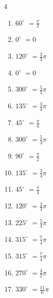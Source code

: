 \begin{multicols}{4}
\begin{enumerate}
  \item $\displaystyle 60^{\circ}$
        $\displaystyle =\frac{\pi}{3}$

  \item $\displaystyle 0^{\circ}$
        $\displaystyle =0$

  \item $\displaystyle 120^{\circ}$
        $\displaystyle =\frac{2}{3}\pi$

  \item $\displaystyle 0^{\circ}$
        $\displaystyle =0$

  \item $\displaystyle 300^{\circ}$
        $\displaystyle =\frac{5}{3}\pi$

  \item $\displaystyle 135^{\circ}$
        $\displaystyle =\frac{3}{4}\pi$

  \item $\displaystyle 45^{\circ}$
        $\displaystyle =\frac{\pi}{4}$

  \item $\displaystyle 300^{\circ}$
        $\displaystyle =\frac{5}{3}\pi$

  \item $\displaystyle 90^{\circ}$
        $\displaystyle =\frac{\pi}{2}$

  \item $\displaystyle 135^{\circ}$
        $\displaystyle =\frac{3}{4}\pi$

  \item $\displaystyle 45^{\circ}$
        $\displaystyle =\frac{\pi}{4}$

  \item $\displaystyle 120^{\circ}$
        $\displaystyle =\frac{2}{3}\pi$

  \item $\displaystyle 225^{\circ}$
        $\displaystyle =\frac{5}{4}\pi$

  \item $\displaystyle 315^{\circ}$
        $\displaystyle =\frac{7}{4}\pi$

  \item $\displaystyle 315^{\circ}$
        $\displaystyle =\frac{7}{4}\pi$

  \item $\displaystyle 270^{\circ}$
        $\displaystyle =\frac{3}{2}\pi$

  \item $\displaystyle 330^{\circ}$
        $\displaystyle =\frac{11}{6}\pi$


\end{enumerate}
\end{multicols}
